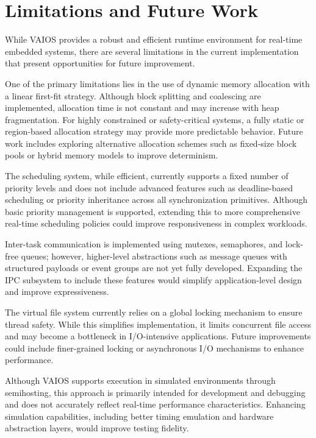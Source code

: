 \section{Limitations and Future Work}
\label{sec:vaios_limitations}

While VAIOS provides a robust and efficient runtime environment for real-time embedded systems, there are several limitations in the current implementation that present opportunities for future improvement.

One of the primary limitations lies in the use of dynamic memory allocation with a linear first-fit strategy. Although block splitting and coalescing are implemented, allocation time is not constant and may increase with heap fragmentation. For highly constrained or safety-critical systems, a fully static or region-based allocation strategy may provide more predictable behavior. Future work includes exploring alternative allocation schemes such as fixed-size block pools or hybrid memory models to improve determinism.

The scheduling system, while efficient, currently supports a fixed number of priority levels and does not include advanced features such as deadline-based scheduling or priority inheritance across all synchronization primitives. Although basic priority management is supported, extending this to more comprehensive real-time scheduling policies could improve responsiveness in complex workloads.

Inter-task communication is implemented using mutexes, semaphores, and lock-free queues; however, higher-level abstractions such as message queues with structured payloads or event groups are not yet fully developed. Expanding the IPC subsystem to include these features would simplify application-level design and improve expressiveness.

The virtual file system currently relies on a global locking mechanism to ensure thread safety. While this simplifies implementation, it limits concurrent file access and may become a bottleneck in I/O-intensive applications. Future improvements could include finer-grained locking or asynchronous I/O mechanisms to enhance performance.

Although VAIOS supports execution in simulated environments through semihosting, this approach is primarily intended for development and debugging and does not accurately reflect real-time performance characteristics. Enhancing simulation capabilities, including better timing emulation and hardware abstraction layers, would improve testing fidelity.

